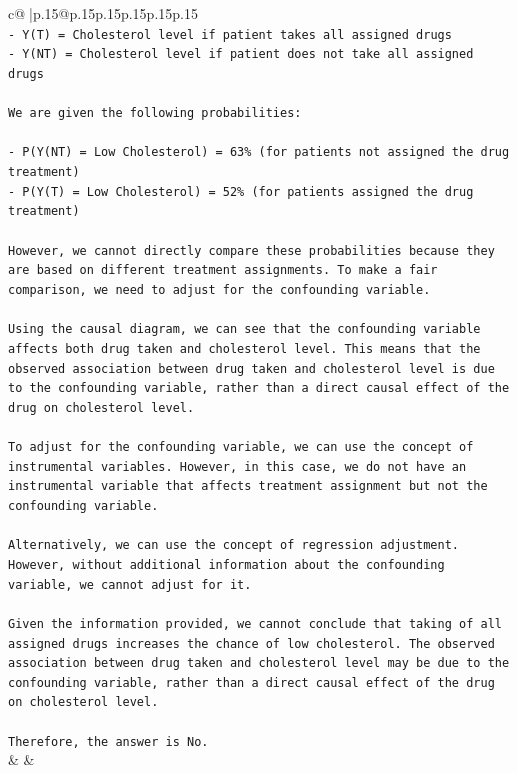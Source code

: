 \documentclass{article}
\begin{document}
{\begin{supertabular}{c@{$\;$}|p{.15\linewidth}@{}p{.15\linewidth}p{.15\linewidth}p{.15\linewidth}p{.15\linewidth}p{.15\linewidth}}
{{{\\ 
\texttt{{-} Y(T) = Cholesterol level if patient takes all assigned drugs} \\
\texttt{{-} Y(NT) = Cholesterol level if patient does not take all assigned drugs} \\
\\ 
\texttt{We are given the following probabilities:} \\
\\ 
\texttt{{-} P(Y(NT) = Low Cholesterol) = 63\% (for patients not assigned the drug treatment)} \\
\texttt{{-} P(Y(T) = Low Cholesterol) = 52\% (for patients assigned the drug treatment)} \\
\\ 
\texttt{However, we cannot directly compare these probabilities because they are based on different treatment assignments. To make a fair comparison, we need to adjust for the confounding variable.} \\
\\ 
\texttt{Using the causal diagram, we can see that the confounding variable affects both drug taken and cholesterol level. This means that the observed association between drug taken and cholesterol level is due to the confounding variable, rather than a direct causal effect of the drug on cholesterol level.} \\
\\ 
\texttt{To adjust for the confounding variable, we can use the concept of instrumental variables. However, in this case, we do not have an instrumental variable that affects treatment assignment but not the confounding variable.} \\
\\ 
\texttt{Alternatively, we can use the concept of regression adjustment. However, without additional information about the confounding variable, we cannot adjust for it.} \\
\\ 
\texttt{Given the information provided, we cannot conclude that taking of all assigned drugs increases the chance of low cholesterol. The observed association between drug taken and cholesterol level may be due to the confounding variable, rather than a direct causal effect of the drug on cholesterol level.} \\
\\ 
\texttt{Therefore, the answer is No.} \\
            }
        }
    }
    & & \\ \\


\end{supertabular}}
\end{document}
